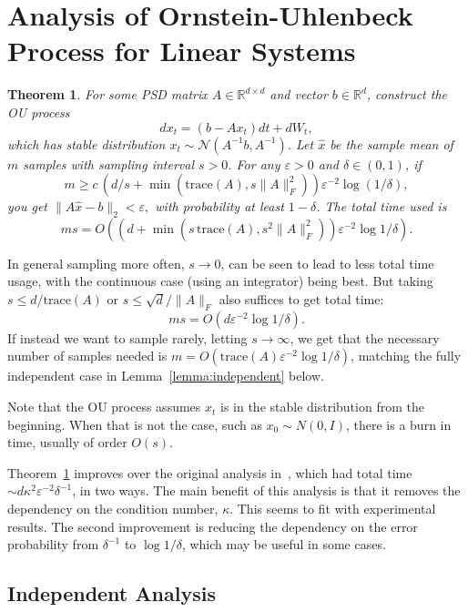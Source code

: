 \documentclass[11pt]{article}
\newtheorem{theorem}{Theorem}
\newcommand{\eps}{\varepsilon}
\newcommand{\N}{\mathcal{N}}
\newcommand{\tr}{\mathrm{trace}}
\begin{document}
\section{Analysis of Ornstein-Uhlenbeck Process for Linear Systems}

\begin{theorem}\label{thm:main}
    For some PSD matrix $A\in\mathbb{R}^{d\times d}$ and vector $b\in\mathbb{R}^{d}$,
    construct the OU process
    \[
    dx_t = (b-A x_t)dt + dW_t,
    \]
    which has stable distribution $x_t \sim \N(A^{-1}b, A^{-1})$.
    Let $\hat{x}$ be the sample mean of $m$ samples with sampling interval $s>0$.
    For any $\eps>0$ and $\delta\in(0,1)$, if
    \[
    m \ge c\, (d/s
    + \min(\tr(A), s\|A\|_F^2)
    )\varepsilon^{-2}\log(1/\delta),
    \]
    you get
    $
    \|A \hat{x} - b\|_2 < \varepsilon,
    $
    with probability at least $1-\delta$.
    The total time used is
    \[
        m s = O((d
        +\min(s\,\tr(A), s^2 \|A\|_F^2)
        ) \varepsilon^{-2} \log1/\delta).
    \]
\end{theorem}
In general sampling more often,
$s\to 0$,
can be seen to lead to less total time usage, with the continuous case (using an integrator) being best.
But taking
$s \le d/\tr(A)$
or
$s \le \sqrt{d}/\|A\|_F$
also suffices to get total time:
\[
    ms = O(d \eps^{-2} \log1/\delta).
\]
If instead we want to sample rarely, letting $s\to\infty$, we get that the necessary number of samples needed is
$m = O(\tr(A) \eps^{-2} \log1/\delta)$,
matching the fully independent case in Lemma~\ref{lemma:independent} below.

Note that the OU process assumes $x_t$ is in the stable distribution from the beginning.
When that is not the case, such as $x_0 \sim N(0,I)$, there is a burn in time, usually of order $O(s)$.

Theorem~\ref{thm:main} improves over the original analysis in~\cite{aifer2023thermodynamic}, which had total time
$\sim d \kappa^2 \eps^{-2} \delta^{-1}$,
in two ways.
%
The main benefit of this analysis is that it removes the dependency on the condition number, $\kappa$.
This seems to fit with experimental results.
%
The second improvement is reducing the dependency on the error probability from $\delta^{-1}$ to $\log1/\delta$, which may be useful in some cases.

\subsection{Independent Analysis}
\end{document}
